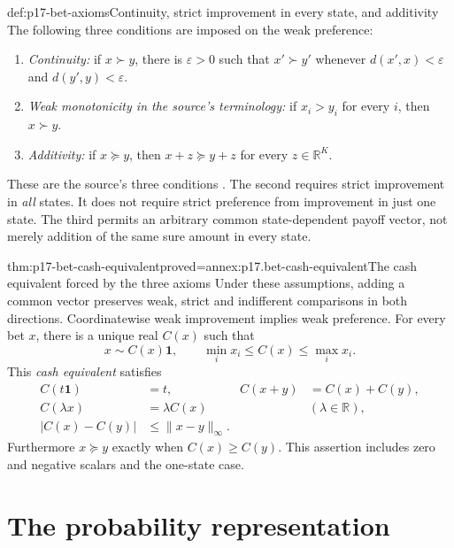 \begin{hbdefinition}{def:p17-bet-axioms}{Continuity, strict improvement in every state, and additivity}
The following three conditions are imposed on the weak preference:
\begin{enumerate}
\item \emph{Continuity:} if \(x\succ y\), there is \(\varepsilon>0\)
such that \(x'\succ y'\) whenever
\(d(x',x)<\varepsilon\) and \(d(y',y)<\varepsilon\).
\item \emph{Weak monotonicity in the source's terminology:} if
\(x_i>y_i\) for every \(i\), then \(x\succ y\).
\item \emph{Additivity:} if \(x\succeq y\), then
\(x+z\succeq y+z\) for every \(z\in\mathbb R^K\).
\end{enumerate}
These are the source's three conditions
\cite[pp.~102--103]{Rubinstein2015LectureNotes}.
The second requires strict improvement in \emph{all} states. It does
not require strict preference from improvement in just one state.
The third permits an arbitrary common state-dependent payoff vector,
not merely addition of the same sure amount in every state.
\end{hbdefinition}

\begin{hblemma}{thm:p17-bet-cash-equivalent}{proved=annex:p17.bet-cash-equivalent}{The cash equivalent forced by the three axioms}
Under these assumptions, adding a common vector preserves weak, strict
and indifferent comparisons in both directions. Coordinatewise weak
improvement implies weak preference.
For every bet \(x\), there is a unique real \(C(x)\) such that
\[
                    x\sim C(x)\mathbf1,
       \qquad \min_i x_i\leq C(x)\leq\max_i x_i.
\]
This \emph{cash equivalent} satisfies
\[
\begin{aligned}
 C(t\mathbf1)&=t,& C(x+y)&=C(x)+C(y),\\
 C(\lambda x)&=\lambda C(x)&& (\lambda\in\mathbb R),\\
 |C(x)-C(y)|&\leq\|x-y\|_\infty.&
\end{aligned}
\]
Furthermore \(x\succeq y\) exactly when \(C(x)\geq C(y)\).
This assertion includes zero and negative scalars and the one-state case.
\end{hblemma}

\section{The probability representation}
\label{sec:p17-subjective-probability-representation}

